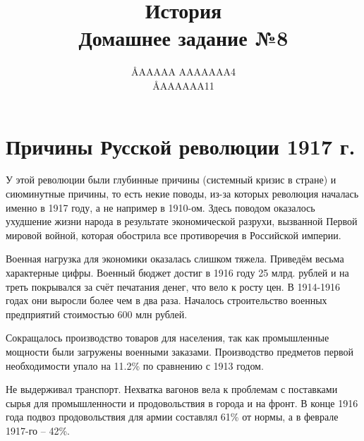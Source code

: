 \documentclass[12pt]{article}
\title{История \\ Домашнее задание №8}
\author{\AA{AAAAA AAAAAAA}{4} \\ \AA{AAAAAA}{11}}
\newcommand{\orange}[1]{{\color{orange}{#1}}}
\begin{document}
  \maketitle

  \setcounter{section}{2}
  \section{Причины Русской революции 1917 г.}

  У этой революции были глубинные причины (системный кризис в стране) и сиюминутные причины,
  то есть некие поводы, из-за которых революция началась именно в 1917 году, а не например в 1910-ом.
  Здесь поводом оказалось ухудшение жизни народа в результате экономической разрухи,
  вызванной Первой мировой войной, которая обострила все противоречия в Российской империи.

  Военная нагрузка для экономики оказалась слишком тяжела.
  Приведём весьма характерные цифры.
  Военный бюджет достиг в 1916 году 25 млрд. рублей и на треть покрывался за счёт печатания денег, что вело к росту цен.
  В 1914-1916 годах они выросли более чем в два раза.
  Началось строительство военных предприятий стоимостью 600 млн рублей.

  Сокращалось производство товаров для населения, так как промышленные мощности были загружены военными заказами.
  Производство предметов первой необходимости упало на 11.2\% по сравнению с 1913 годом.

  Не выдерживал транспорт.
  Нехватка вагонов вела к проблемам с поставками сырья для промышленности и продовольствия в города и на фронт.
  В конце 1916 года подвоз продовольствия для армии составлял 61\% от нормы, а в феврале 1917-го -- 42\%.

\end{document}
